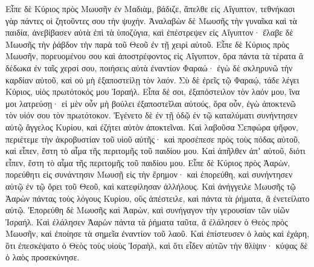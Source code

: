 {Εἶπε δὲ Κύριος πρὸς Μωυσῆν ἐν Μαδιὰμ, βάδιζε, ἄπελθε εἰς Αἴγυπτον, τεθνήκασι γὰρ πάντες οἱ ζητοῦντες σου τὴν ψυχήν.
Ἀναλαβὼν δὲ Μωυσῆς τὴν γυναῖκα καὶ τὰ παιδία, ἀνεβίβασεν αὐτὰ ἐπὶ τὰ ὑποζύγια, καὶ ἐπέστρεψεν εἰς Αἴγυπτον· ἔλαβε δὲ Μωυσῆς τὴν ῥάβδον τὴν παρὰ τοῦ Θεοῦ ἐν τῇ χειρὶ αὐτοῦ.
Εἶπε δὲ Κύριος πρὸς Μωυσῆν, πορευομένου σου καὶ ἀποστρέφοντος εἰς Αἴγυπτον, ὅρα πάντα τὰ τέρατα ἃ δέδωκα ἐν ταῖς χερσί σου, ποιήσεις αὐτὰ ἐναντίον Φαραώ· ἐγὼ δὲ σκληρυνῶ τὴν καρδίαν αὐτοῦ, καὶ οὐ μὴ ἐξαποστείλῃ τὸν λαόν.
Σὺ δὲ ἐρεῖς τῷ Φαραῴ, τάδε λέγει Κύριος, υἱὸς πρωτότοκός μου Ἰσραήλ.
Εἶπα δέ σοι, ἐξαπόστειλον τὸν λαόν μου, ἵνα μοι λατρεύσῃ· εἰ μὲν οὖν μὴ βούλει ἐξαποστεῖλαι αὐτούς, ὅρα οὖν, ἐγὼ ἀποκτενῶ τὸν υἱόν σου τὸν πρωτότοκον.
Ἐγένετο δὲ ἐν τῇ ὁδῷ ἐν τῷ καταλύματι συνήντησεν αὐτῷ ἄγγελος Κυρίου, καὶ ἐζήτει αὐτὸν ἀποκτεῖναι.
Καὶ λαβοῦσα Σεπφώρα ψῆφον, περιέτεμε τὴν ἀκροβυστίαν τοῦ υἱοῦ αὐτῆς· καὶ προσέπεσε πρὸς τοὺς πόδας αὐτοῦ, καὶ εἶπεν, ἔστη τὸ αἷμα τῆς περιτομῆς τοῦ παιδίου μου.
Καὶ ἀπῆλθεν ἀπʼ αὐτοῦ, διότι εἶπεν, ἔστη τὸ αἷμα τῆς περιτομῆς τοῦ παιδίου μου.
Εἶπε δὲ Κύριος πρὸς Ἀαρὼν, πορεύθητι εἰς συνάντησιν Μωυσῇ εἰς τὴν ἔρημον· καὶ ἐπορεύθη, καὶ συνήντησεν αὐτῷ ἐν τῷ ὄρει τοῦ Θεοῦ, καὶ κατεφίλησαν ἀλλήλους.
Καὶ ἀνήγγειλε Μωυσῆς τῷ Ἀαρὼν πάντας τοὺς λόγους Κυρίου, οὓς ἀπέστειλε, καὶ πάντα τὰ ῥήματα, ἃ ἐνετείλατο αὐτῷ.
Ἐπορεύθη δὲ Μωυσῆς καὶ Ἀαρὼν, καὶ συνήγαγον τὴν γερουσίαν τῶν υἱῶν Ἰσραήλ.
Καὶ ἐλάλησεν Ἀαρὼν πάντα τὰ ῥήματα ταῦτα, ἃ ἐλάλησεν ὁ Θεὸς πρὸς Μωυσῆν, καὶ ἐποίησε τὰ σημεῖα ἐναντίον τοῦ λαοῦ.
Καὶ ἐπίστευσεν ὁ λαὸς καὶ ἐχάρη, ὅτι ἐπεσκέψατο ὁ Θεὸς τοὺς υἱοὺς Ἰσραὴλ, καὶ ὅτι εἶδεν αὐτῶν τὴν θλίψιν· κύψας δὲ ὁ λαὸς προσεκύνησε.

}
